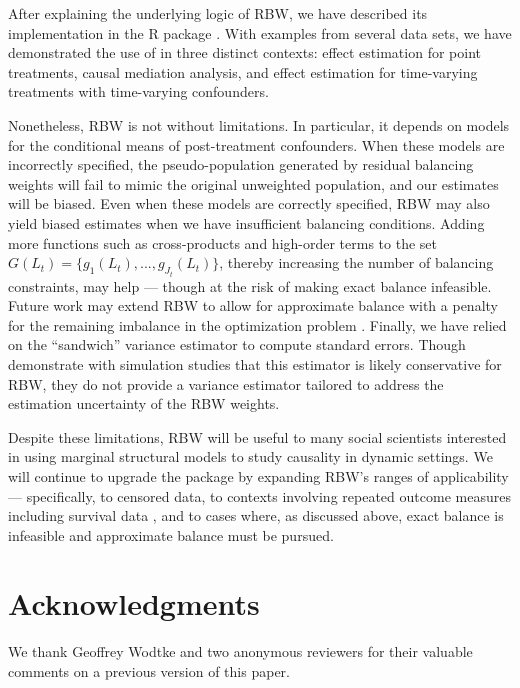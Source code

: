 After explaining the underlying logic of RBW, we have described its
implementation in the R package . With examples from
several data sets, we have demonstrated the use of  in
three distinct contexts: effect estimation for point treatments, causal
mediation analysis, and effect estimation for time-varying treatments
with time-varying confounders.

Nonetheless, RBW is not without limitations. In particular, it depends
on models for the conditional means of post-treatment confounders. When
these models are incorrectly specified, the pseudo-population generated
by residual balancing weights will fail to mimic the original unweighted
population, and our estimates will be biased. Even when these models are
correctly specified, RBW may also yield biased estimates when we have
insufficient balancing conditions. Adding more functions such as
cross-products and high-order terms to the set
\(G(L_{t})=\{g_{1}(L_{t}),...,g_{J_{t}}(L_{t})\}\), thereby increasing
the number of balancing constraints, may help --- though at the risk of
making exact balance infeasible. Future work may extend RBW to allow for
approximate balance with a penalty for the remaining imbalance in the
optimization problem \citep{fongCovariateBalancingPropensity2018}.
Finally, we have relied on the ``sandwich'' variance estimator to
compute standard errors. Though \citet{zhouResidualBalancingMethod2020a}
demonstrate with simulation studies that this estimator is likely
conservative for RBW, they do not provide a variance estimator tailored
to address the estimation uncertainty of the RBW weights.

Despite these limitations, RBW will be useful to many social scientists
interested in using marginal structural models to study causality in
dynamic settings. We will continue to upgrade the package by expanding
RBW's ranges of applicability --- specifically, to censored data, to
contexts involving repeated outcome measures including survival data
\citep{hernanMarginalStructuralModels2000, hernanEstimatingCausalEffect2002},
and to cases where, as discussed above, exact balance is infeasible and
approximate balance must be pursued.

\hypertarget{acknowledgments}{%
\section{Acknowledgments}\label{acknowledgments}}

We thank Geoffrey Wodtke and two anonymous reviewers for their valuable
comments on a previous version of this paper.



\address{%
Derick S. Baum\\
Harvard University\\%
Department of Sociology\\
%
%
%
\href{mailto:derick_baum@g.harvard.edu}{\nolinkurl{derick\_baum@g.harvard.edu}}%
}

\address{%
Xiang Zhou\\
Harvard University\\%
Department of Sociology\\
%
%
%
\href{mailto:xiang_zhou@fas.harvard.edu}{\nolinkurl{xiang\_zhou@fas.harvard.edu}}%
}
